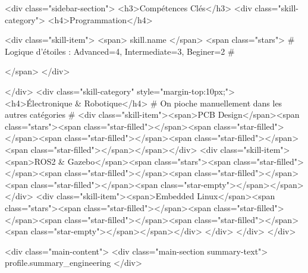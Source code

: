 {{{{{{{            <div class="sidebar-section">
                <h3>Compétences Clés</h3>
                <div class="skill-category">
                    <h4>Programmation</h4>
                    {%
                    <div class="skill-item">
                        <span>{{ skill.name }}</span>
                        <span class="stars">
                            {# Logique d'étoiles : Advanced=4, Intermediate=3, Beginer=2 #}
                            {%
                            {%
                            {%
                            {%
                        </span>
                    </div>
                    {%
                </div>
                <div class="skill-category" style="margin-top:10px;">
                    <h4>Électronique & Robotique</h4>
                    {# On pioche manuellement dans les autres catégories #}
                    <div class="skill-item"><span>PCB Design</span><span class="stars"><span class="star-filled"></span><span class="star-filled"></span><span class="star-filled"></span><span class="star-filled"></span><span class="star-filled"></span></span></div>
                    <div class="skill-item"><span>ROS2 & Gazebo</span><span class="stars"><span class="star-filled"></span><span class="star-filled"></span><span class="star-filled"></span><span class="star-filled"></span><span class="star-empty"></span></span></div>
                    <div class="skill-item"><span>Embedded Linux</span><span class="stars"><span class="star-filled"></span><span class="star-filled"></span><span class="star-filled"></span><span class="star-filled"></span><span class="star-empty"></span></span></div>
                </div>
            </div>
        </div>

        <div class="main-content">
            <div class="main-section summary-text">
                {{ profile.summary_engineering }}
            </div>

}}}}}}}}}}}}}
